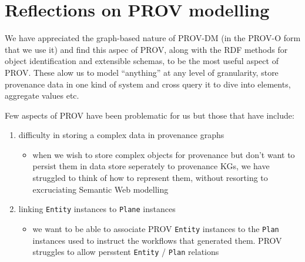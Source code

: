 \documentclass[letterpaper,twocolumn,10pt]{article}
\begin{document}

\section{Reflections on PROV modelling}
We have appreciated the graph-based nature of PROV-DM (in the PROV-O form that we use it) and find this aspec of PROV, along with the RDF methods for
object identification and extensible schemas, to be the most useful aspect of PROV. These alow us to model ``anything'' at any level of granularity,
store provenance data in one kind of system and cross query it to dive into elements, aggregate values etc.

Few aspects of PROV have been problematic for us but those that have include:

\begin{enumerate}
  \item difficulty in storing a complex data in provenance graphs
  \begin{itemize}
    \item when we wish to store complex objects for provenance but don't want to persist them in data store seperately to provenance KGs, we have struggled to think of how to represent them, without resorting to excruciating Semantic Web modelling
  \end{itemize}
  \item linking \texttt{Entity} instances to \texttt{Plane} instances
  \begin{itemize}
    \item we want to be able to associate PROV \texttt{Entity} instances to the \texttt{Plan} instances used to instruct the workflows that generated them. PROV struggles to allow persstent \texttt{Entity} / \texttt{Plan} relations
  \end{itemize}
\end{enumerate}  

\end{document}
